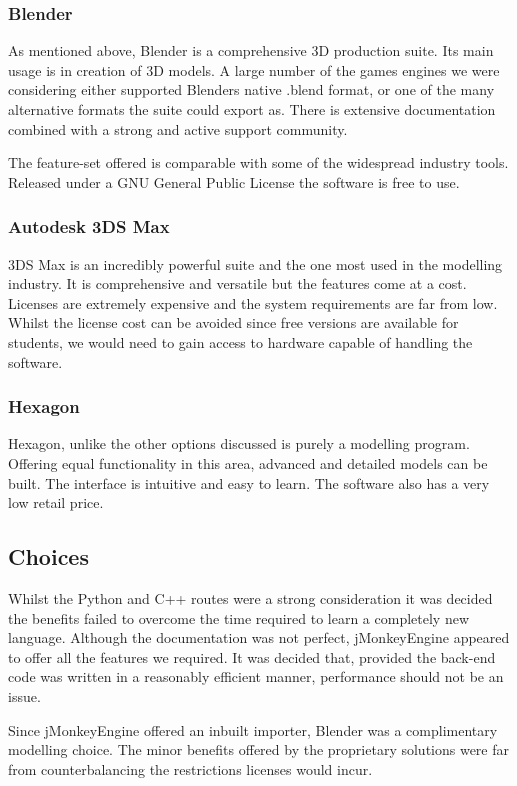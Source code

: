 \subsubsection{Blender}

As mentioned above, Blender is a comprehensive 3D production suite.
Its main usage is in creation of 3D models. A large number of the
games engines we were considering either supported Blenders native
.blend format, or one of the many alternative formats the suite could
export as. There is extensive documentation combined with a strong
and active support community.

The feature-set offered is comparable with some of the widespread industry
tools. Released under a GNU General Public License the software is
free to use.


\subsubsection{Autodesk 3DS Max}

3DS Max is an incredibly powerful suite and the one most used in the
modelling industry. It is comprehensive and versatile but the features come
at a cost. Licenses are extremely expensive and the system requirements
are far from low. Whilst the license cost can be avoided since free
versions are available for students, we would need to gain access
to hardware capable of handling the software.

\subsubsection{Hexagon}

Hexagon, unlike the other options discussed is purely a modelling program.
Offering equal functionality in this area, advanced and detailed models
can be built. The interface is intuitive and easy to learn. The software
also has a very low retail price.

\subsection{Choices}

Whilst the Python and C++ routes were a strong consideration it was
decided the benefits failed to overcome the time required to learn
a completely new language. Although the documentation was not perfect,
jMonkeyEngine appeared to offer all the features we required. It was decided
that, provided the back-end code was written in a reasonably efficient
manner, performance should not be an issue.

Since jMonkeyEngine offered an inbuilt importer, Blender was a complimentary
modelling choice. The minor benefits offered by the proprietary solutions
were far from counterbalancing the restrictions licenses would incur.

